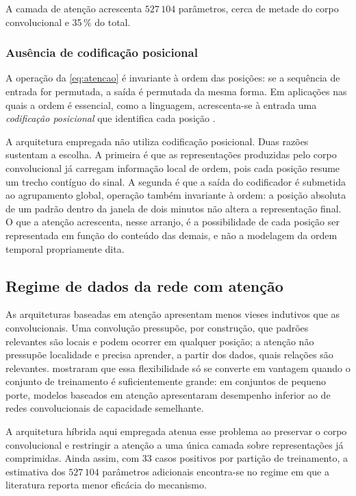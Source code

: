 A camada de atenção acrescenta $527\,104$ parâmetros, cerca de metade do
corpo convolucional e 35\,\% do total.

\subsubsection{Ausência de codificação posicional}
\label{subsubsec:fund-posicional}

A operação da \autoref{eq:atencao} é invariante à ordem das posições: se a
sequência de entrada for permutada, a saída é permutada da mesma forma. Em
aplicações nas quais a ordem é essencial, como a linguagem, acrescenta-se à
entrada uma \textit{codificação posicional} que identifica cada posição
\cite{vaswani2017attention}.

A arquitetura empregada não utiliza codificação posicional. Duas razões
sustentam a escolha. A primeira é que as representações produzidas pelo
corpo convolucional já carregam informação local de ordem, pois cada posição
resume um trecho contíguo do sinal. A segunda é que a saída do codificador é
submetida ao agrupamento global, operação também invariante à ordem: a
posição absoluta de um padrão dentro da janela de dois minutos não altera a
representação final. O que a atenção acrescenta, nesse arranjo, é a
possibilidade de cada posição ser representada em função do conteúdo das
demais, e não a modelagem da ordem temporal propriamente dita.

\subsection{Regime de dados da rede com atenção}
\label{subsec:fund-atencao-regime}

As arquiteturas baseadas em atenção apresentam menos vieses indutivos que
as convolucionais. Uma convolução pressupõe, por construção, que padrões
relevantes são locais e podem ocorrer em qualquer posição; a atenção não
pressupõe localidade e precisa aprender, a partir dos dados, quais relações
são relevantes.  mostraram que essa
flexibilidade só se converte em vantagem quando o conjunto de treinamento é
suficientemente grande: em conjuntos de pequeno porte, modelos baseados em
atenção apresentaram desempenho inferior ao de redes convolucionais de
capacidade semelhante.

A arquitetura híbrida aqui empregada atenua esse problema ao preservar o
corpo convolucional e restringir a atenção a uma única camada sobre
representações já comprimidas. Ainda assim, com 33 casos positivos por
partição de treinamento, a estimativa dos $527\,104$ parâmetros adicionais
encontra-se no regime em que a literatura reporta menor eficácia do
mecanismo.



